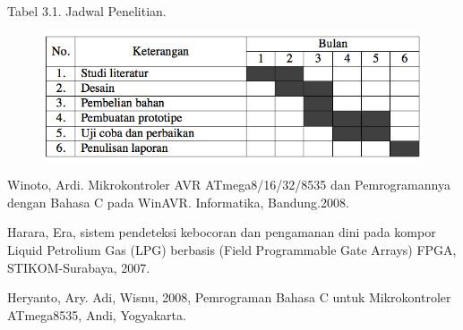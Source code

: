 \documentclass{jtetiproposalskripsi}
\begin{document}
\begin{center}
Tabel 3.1. Jadwal Penelitian.
\end{center}
\vspace{-0.5cm}
\begin{figure}[ht!]
  \centering
    \includegraphics[width=13cm]{gambar/timeline}
\end{figure}


\begin{thebibliography}{9}

Winoto, Ardi. Mikrokontroler AVR ATmega8/16/32/8535 dan
Pemrogramannya dengan Bahasa C pada WinAVR. Informatika,
Bandung.2008. 

Harara, Era, sistem pendeteksi kebocoran dan pengamanan dini
pada kompor Liquid Petrolium Gas (LPG) berbasis (Field
Programmable Gate Arrays) FPGA, STIKOM-Surabaya, 2007. 

Heryanto, Ary. Adi, Wisnu, 2008, Pemrograman Bahasa C untuk
Mikrokontroler ATmega8535, Andi, Yogyakarta.



\end{thebibliography}
\end{document}
